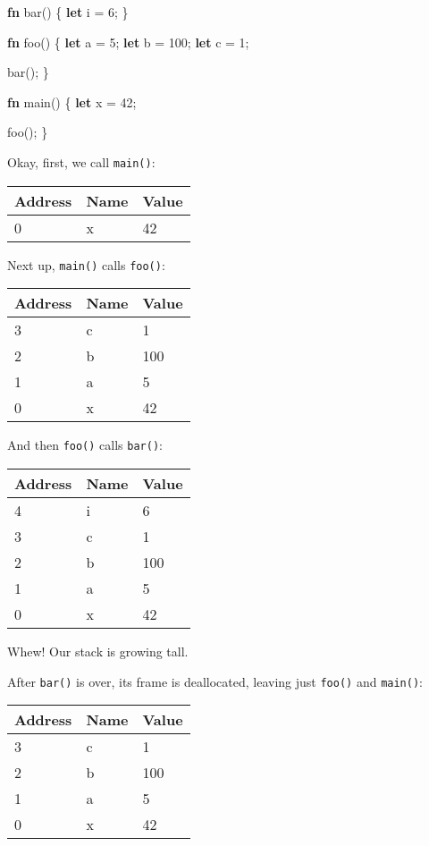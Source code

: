\documentclass[a4paper,]{book}
\newenvironment{Shaded}{\begin{snugshade}}{\end{snugshade}}
\newcommand{\KeywordTok}[1]{\textcolor[rgb]{0.13,0.29,0.53}{\textbf{{#1}}}}
\newcommand{\DecValTok}[1]{\textcolor[rgb]{0.00,0.00,0.81}{{#1}}}
\newcommand{\NormalTok}[1]{{#1}}
\begin{document}
\begin{Shaded}
\begin{Highlighting}[]
\KeywordTok{fn} \NormalTok{bar() \{}
    \KeywordTok{let} \NormalTok{i = }\DecValTok{6}\NormalTok{;}
\NormalTok{\}}

\KeywordTok{fn} \NormalTok{foo() \{}
    \KeywordTok{let} \NormalTok{a = }\DecValTok{5}\NormalTok{;}
    \KeywordTok{let} \NormalTok{b = }\DecValTok{100}\NormalTok{;}
    \KeywordTok{let} \NormalTok{c = }\DecValTok{1}\NormalTok{;}

    \NormalTok{bar();}
\NormalTok{\}}

\KeywordTok{fn} \NormalTok{main() \{}
    \KeywordTok{let} \NormalTok{x = }\DecValTok{42}\NormalTok{;}

    \NormalTok{foo();}
\NormalTok{\}}
\end{Highlighting}
\end{Shaded}

Okay, first, we call \texttt{main()}:

\begin{longtable}[c]{@{}lll@{}}
\toprule
Address & Name & Value\tabularnewline
\midrule
\endhead
0 & x & 42\tabularnewline
\bottomrule
\end{longtable}

Next up, \texttt{main()} calls \texttt{foo()}:

\begin{longtable}[c]{@{}lll@{}}
\toprule
Address & Name & Value\tabularnewline
\midrule
\endhead
3 & c & 1\tabularnewline
2 & b & 100\tabularnewline
1 & a & 5\tabularnewline
0 & x & 42\tabularnewline
\bottomrule
\end{longtable}

And then \texttt{foo()} calls \texttt{bar()}:

\begin{longtable}[c]{@{}lll@{}}
\toprule
Address & Name & Value\tabularnewline
\midrule
\endhead
4 & i & 6\tabularnewline
3 & c & 1\tabularnewline
2 & b & 100\tabularnewline
1 & a & 5\tabularnewline
0 & x & 42\tabularnewline
\bottomrule
\end{longtable}

Whew! Our stack is growing tall.

After \texttt{bar()} is over, its frame is deallocated, leaving just
\texttt{foo()} and \texttt{main()}:

\begin{longtable}[c]{@{}lll@{}}
\toprule
Address & Name & Value\tabularnewline
\midrule
\endhead
3 & c & 1\tabularnewline
2 & b & 100\tabularnewline
1 & a & 5\tabularnewline
0 & x & 42\tabularnewline
\bottomrule
\end{longtable}
\end{document}

